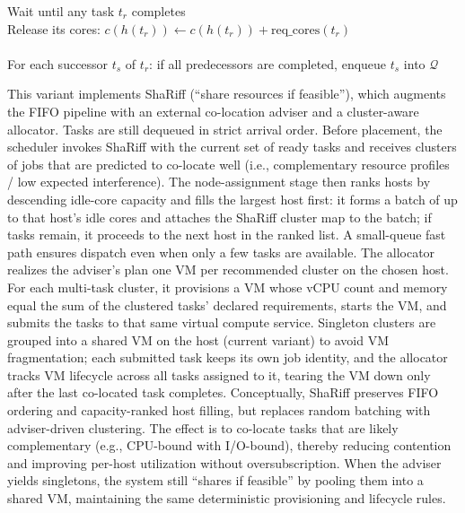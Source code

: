 \begin{algorithm}[H]
{        \BlankLine
        Wait until any task \( t_r \) completes\\
        Release its cores: \( c(h(t_r)) \gets c(h(t_r)) + \text{req\_cores}(t_r) \)\\
        \\
        For each successor \( t_s \) of \( t_r \): if all predecessors are completed, enqueue \( t_s \) into \( \mathcal{Q} \)
    }
\end{algorithm}

This variant implements ShaRiff (“share resources if feasible”), which augments the FIFO pipeline with an external co-location adviser and a cluster-aware allocator. Tasks are still dequeued in strict arrival order. Before placement, the scheduler invokes ShaRiff with the current set of ready tasks and receives clusters of jobs that are predicted to co-locate well (i.e., complementary resource profiles / low expected interference). The node-assignment stage then ranks hosts by descending idle-core capacity and fills the largest host first: it forms a batch of up to that host’s idle cores and attaches the ShaRiff cluster map to the batch; if tasks remain, it proceeds to the next host in the ranked list. A small-queue fast path ensures dispatch even when only a few tasks are available.
The allocator realizes the adviser’s plan one VM per recommended cluster on the chosen host. For each multi-task cluster, it provisions a VM whose vCPU count and memory equal the sum of the clustered tasks’ declared requirements, starts the VM, and submits the tasks to that same virtual compute service. Singleton clusters are grouped into a shared VM on the host (current variant) to avoid VM fragmentation; each submitted task keeps its own job identity, and the allocator tracks VM lifecycle across all tasks assigned to it, tearing the VM down only after the last co-located task completes.
Conceptually, ShaRiff preserves FIFO ordering and capacity-ranked host filling, but replaces random batching with adviser-driven clustering. The effect is to co-locate tasks that are likely complementary (e.g., CPU-bound with I/O-bound), thereby reducing contention and improving per-host utilization without oversubscription. When the adviser yields singletons, the system still “shares if feasible” by pooling them into a shared VM, maintaining the same deterministic provisioning and lifecycle rules.


